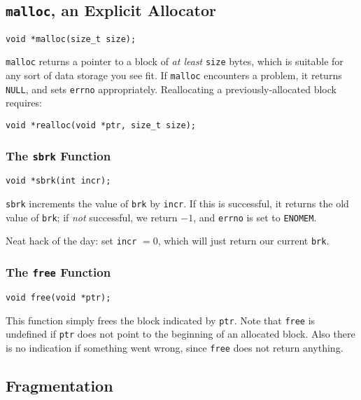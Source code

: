 \documentclass[fleqn]{article}
\begin{document}
\subsection{\texttt{malloc}, an Explicit Allocator}

\begin{verbatim}
void *malloc(size_t size);
\end{verbatim}

\texttt{malloc} returns a pointer to a block of \textit{at least} \texttt{size} bytes, which is suitable for any sort of data storage you see fit. If \texttt{malloc} encounters a problem, it returns \texttt{NULL}, and sets \texttt{errno} appropriately. Reallocating a previously-allocated block requires:

\begin{verbatim}
void *realloc(void *ptr, size_t size);
\end{verbatim}

\subsubsection{The \texttt{sbrk} Function}

\begin{verbatim}
void *sbrk(int incr);
\end{verbatim}

\texttt{sbrk} increments the value of \texttt{brk} by \texttt{incr}. If this is successful, it returns the old value of \texttt{brk}; if \textit{not} successful, we return $-1$, and \texttt{errno} is set to \texttt{ENOMEM}.

Neat hack of the day: set \texttt{incr} $=0$, which will just return our current \texttt{brk}.

\subsubsection{The \texttt{free} Function}

\begin{verbatim}
void free(void *ptr);
\end{verbatim}

This function simply frees the block indicated by \texttt{ptr}. Note that \texttt{free} is undefined if \texttt{ptr} does not point to the beginning of an allocated block. Also there is no indication if something went wrong, since \texttt{free} does not return anything.

\subsection{Fragmentation}
\end{document}
